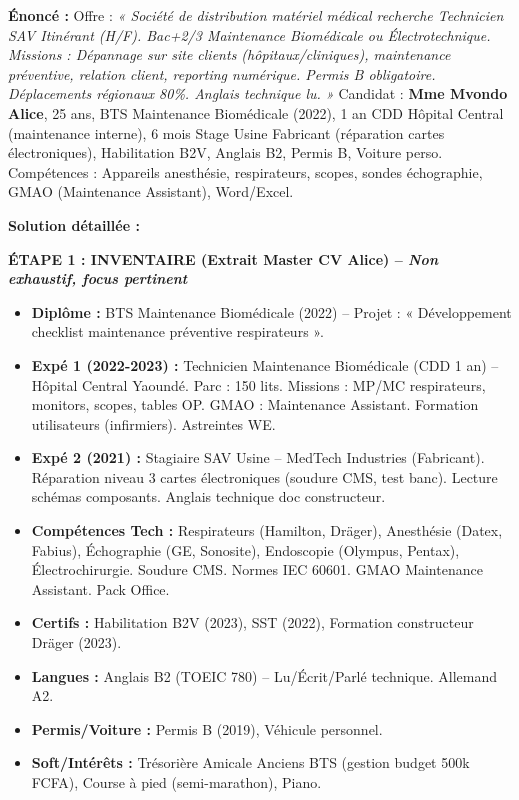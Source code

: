 \documentclass[11pt]{article}
\begin{document}
\begin{exoresolu}
    \textbf{Énoncé :} Offre : \emph{« Société de distribution matériel médical recherche Technicien SAV Itinérant (H/F). Bac+2/3 Maintenance Biomédicale ou Électrotechnique. Missions : Dépannage sur site clients (hôpitaux/cliniques), maintenance préventive, relation client, reporting numérique. Permis B obligatoire. Déplacements régionaux 80\%. Anglais technique lu. »}
    Candidat : \textbf{Mme Mvondo Alice}, 25 ans, BTS Maintenance Biomédicale (2022), 1 an CDD Hôpital Central (maintenance interne), 6 mois Stage Usine Fabricant (réparation cartes électroniques), Habilitation B2V, Anglais B2, Permis B, Voiture perso. Compétences : Appareils anesthésie, respirateurs, scopes, sondes échographie, GMAO (Maintenance Assistant), Word/Excel.

    \tcblower
    \textbf{Solution détaillée :}

    \textbf{ÉTAPE 1 : INVENTAIRE (Extrait Master CV Alice) -- \textit{Non exhaustif, focus pertinent}}
    \begin{itemize}
        \item \textbf{Diplôme :} BTS Maintenance Biomédicale (2022) -- Projet : « Développement checklist maintenance préventive respirateurs ».
        \item \textbf{Expé 1 (2022-2023) :} Technicien Maintenance Biomédicale (CDD 1 an) -- Hôpital Central Yaoundé. Parc : 150 lits. Missions : MP/MC respirateurs, monitors, scopes, tables OP. GMAO : Maintenance Assistant. Formation utilisateurs (infirmiers). Astreintes WE.
        \item \textbf{Expé 2 (2021) :} Stagiaire SAV Usine -- MedTech Industries (Fabricant). Réparation niveau 3 cartes électroniques (soudure CMS, test banc). Lecture schémas composants. Anglais technique doc constructeur.
        \item \textbf{Compétences Tech :} Respirateurs (Hamilton, Dräger), Anesthésie (Datex, Fabius), Échographie (GE, Sonosite), Endoscopie (Olympus, Pentax), Électrochirurgie. Soudure CMS. Normes IEC 60601. GMAO Maintenance Assistant. Pack Office.
        \item \textbf{Certifs :} Habilitation B2V (2023), SST (2022), Formation constructeur Dräger (2023).
        \item \textbf{Langues :} Anglais B2 (TOEIC 780) -- Lu/Écrit/Parlé technique. Allemand A2.
        \item \textbf{Permis/Voiture :} Permis B (2019), Véhicule personnel.
        \item \textbf{Soft/Intérêts :} Trésorière Amicale Anciens BTS (gestion budget 500k FCFA), Course à pied (semi-marathon), Piano.
    \end{itemize}


\end{exoresolu}
\end{document}
